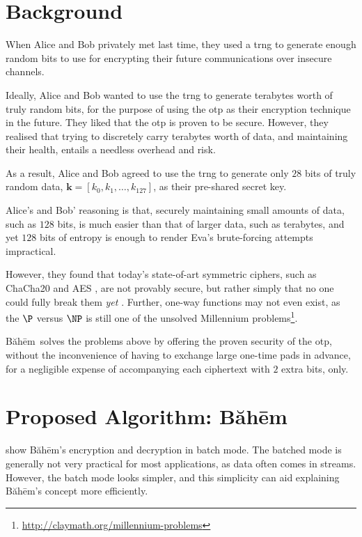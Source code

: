 \documentclass[twocolumn]{article}
\newcommand{\baheem}{Băhēm}
\begin{document}
\tableofcontents
\vfill

\section{Background}
When Alice and Bob privately met last time, they used a \gls{trng} to generate
enough random bits to use for encrypting their future communications over
insecure channels.

Ideally, Alice and Bob wanted to use the \gls{trng} to generate terabytes
worth of truly random bits, for the purpose of using the \gls{otp} as their
encryption technique in the future.  They liked that the \gls{otp} is
proven to be secure.  However, they realised that trying to discretely
carry terabytes worth of data, and maintaining their health, entails a
needless overhead and risk.

As a result, Alice and Bob agreed to use the \gls{trng} to generate only
$28$ bits of truly random data, $\mathbf{k} = [k_0, k_1, \ldots, k_{127}]$,
as their pre-shared secret key.

Alice's and Bob' reasoning is that, securely maintaining small amounts of
data, such as $128$ bits, is much easier than that of larger data, such as
terabytes, and yet $128$ bits of entropy is enough to render Eva's
brute-forcing attempts impractical.

However, they found that today's state-of-art symmetric ciphers, such as
ChaCha20 \cite{chacha20} and AES \cite{aes}, are not provably secure, but
rather simply that no one could fully break them \emph{yet}
\cite{cryptoeprint:2007:472}. Further, one-way functions may not even
exist, as the $\P$ versus $\NP$ is still one of the unsolved Millennium
problems\footnote{\url{http://claymath.org/millennium-problems}}.

\baheem\ solves the problems above by offering the proven security of the
\gls{otp}, without the inconvenience of having to exchange large one-time
pads in advance, for a negligible expense of accompanying each ciphertext
with $2$ extra bits, only.

\section{Proposed Algorithm:  \baheem}
 show \baheem's encryption and
decryption in batch mode.  The batched mode is generally not very practical
for most applications, as data often comes in streams. However, the batch
mode looks simpler, and this simplicity can aid explaining \baheem's
concept more efficiently.
\end{document}
